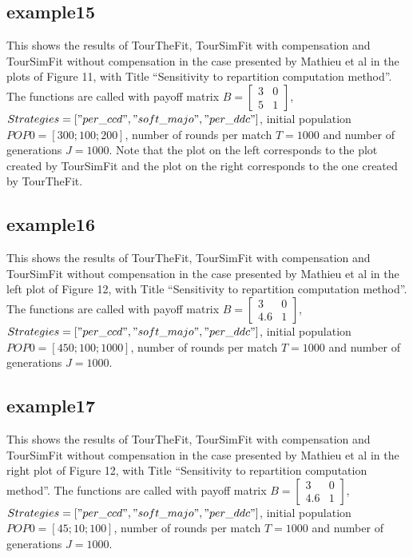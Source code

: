 \documentclass[12pt]{article}
\begin{document}
\subsection{example15}
This shows the results of TourTheFit, TourSimFit with compensation and TourSimFit without compensation in the case presented by Mathieu et al in the plots of Figure 11, with Title ``Sensitivity to repartition computation method''. The functions are called with payoff matrix $B = \begin{bmatrix} 3 & 0 \\ 5 & 1 \end{bmatrix}$, $Strategies = ["per\_ccd", \- "soft\_majo", "per\_ddc"]$, initial population $POP0 = [300; 100; 200]$, number of rounds per match $T = 1000$ and number of generations $J = 1000$. Note that the plot on the left corresponds to the plot created by TourSimFit and the plot on the right corresponds to the one created by TourTheFit.

\subsection{example16}
This shows the results of TourTheFit, TourSimFit with compensation and TourSimFit without compensation in the case presented by Mathieu et al in the left plot of Figure 12, with Title ``Sensitivity to repartition computation method''. The functions are called with payoff matrix $B = \begin{bmatrix} 3 & 0 \\ 4.6 & 1 \end{bmatrix}$, $Strategies = ["per\_ccd", "soft\_majo", "per\_ddc"]$, initial population $POP0 = [450; 100; 1000]$, number of rounds per match $T = 1000$ and number of generations $J = 1000$.

\subsection{example17}
This shows the results of TourTheFit, TourSimFit with compensation and TourSimFit without compensation in the case presented by Mathieu et al in the right plot of Figure 12, with Title ``Sensitivity to repartition computation method''. The functions are called with payoff matrix $B = \begin{bmatrix} 3 & 0 \\ 4.6 & 1 \end{bmatrix}$, $Strategies = ["per\_ccd", "soft\_majo", "per\_ddc"]$, initial population $POP0 = [45; 10; 100]$, number of rounds per match $T = 1000$ and number of generations $J = 1000$.
\end{document}
